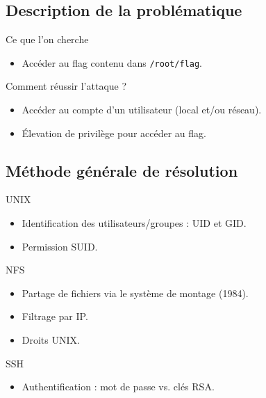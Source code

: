 \documentclass{beamer}
\begin{document}
\subsection{Description de la problématique}

\begin{frame}[fragile]
\begin{block}{Ce que l'on cherche}
\begin{itemize}
\item Accéder au flag contenu dans \verb+/root/flag+.
\end{itemize}
\end{block}
\begin{block}{Comment réussir l'attaque ?}
\begin{itemize}
\item Accéder au compte d'un utilisateur (local et/ou réseau).
\item Élevation de privilège pour accéder au flag.
\end{itemize}
\end{block}
\end{frame}

\subsection{Méthode générale de résolution}

\begin{frame}[t]
\begin{block}{UNIX}
\begin{itemize}
\item Identification des utilisateurs/groupes : UID et GID.
\item Permission SUID.
\end{itemize}
\end{block}
\begin{block}{NFS}
\begin{itemize}
\item Partage de fichiers via le système de montage (1984).
\item Filtrage par IP.
\item Droits UNIX.
\end{itemize}
\end{block}
\begin{block}{SSH}
\begin{itemize}
\item Authentification : mot de passe vs. clés RSA.
\end{itemize}
\end{block}
\end{frame}
\end{document}
